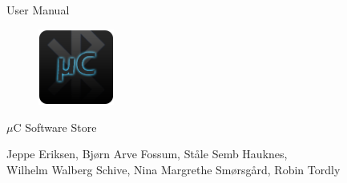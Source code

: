 \begin{titlepage}
\begin{center}
\vspace*{1in}
{\LARGE User Manual}
\par
\vspace{1cm}


\begin{figure}[ht!]
\centering
\includegraphics[width=25mm]{images/ic_launcher.png}
\label{overflow}
\end{figure}


{\LARGE $\mu$C Software Store}
\par
\vspace{0.6in}
\vfill
\par
\vspace{0.5in}
Jeppe Eriksen, Bjørn Arve Fossum, Ståle Semb Hauknes,\\ Wilhelm Walberg Schive, Nina Margrethe Smørsgård, Robin Tordly\\
\par
\end{center}
\end{titlepage}
